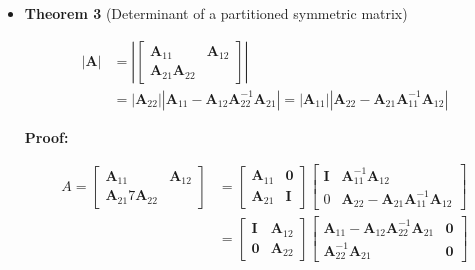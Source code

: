 \documentclass[10pt,b5paper,titlepage]{book}
\begin{document}
\begin{itemize}
    \item \textbf{Theorem 3} (Determinant of a partitioned symmetric matrix)

        \begin{equation}
            \begin{array}{ll}
                |\mathbf{A}|  &= \left|
                \begin{bmatrix}
                    \mathbf{A}_{11} & \mathbf{A}_{12}\\
                    \mathbf{A}_{21} \mathbf{A}_{22}
                \end{bmatrix}  \right|\\
                              &=
                |\mathbf{A}_{22}| |\mathbf{A}_{11} - \mathbf{A}_{12} \mathbf{A}_{22}^{-1} \mathbf{A}_{21}|
                = |\mathbf{A}_{11}| |\mathbf{A}_{22} - \mathbf{A}_{21} \mathbf{A}_{11}^{-1} \mathbf{A}_{12}|
            \end{array}
        \end{equation}

        \textbf{Proof:}

        \begin{equation}
            \begin{array}{ll}
                A = \begin{bmatrix}
                    \mathbf{A}_{11} & \mathbf{A}_{12}\\
                    \mathbf{A}_{21} 7 \mathbf{A}_{22}
                \end{bmatrix} &= \begin{bmatrix}
                    \mathbf{A}_{11} & \mathbf{0}\\
                    \mathbf{A}_{21} & \mathbf{I}
                \end{bmatrix} \begin{bmatrix}
                    \mathbf{I} & \mathbf{A}_{11}^{-1} \mathbf{A}_{12}\\
                    0 & \mathbf{A}_{22} - \mathbf{A}_{21} \mathbf{A}_{11}^{-1} \mathbf{A}_{12}
                \end{bmatrix}\\
                &= \begin{bmatrix}
                    \mathbf{I} & \mathbf{A}_{12}\\
                    \mathbf{0} & \mathbf{A}_{22}
                \end{bmatrix} \begin{bmatrix}
                    \mathbf{A}_{11} - \mathbf{A}_{12} \mathbf{A}_{22}^{-1} \mathbf{A}_{21} & \mathbf{0}\\
                    \mathbf{A}_{22}^{-1} \mathbf{A}_{21} & \mathbf{0}
                \end{bmatrix}
            \end{array}
        \end{equation}


\end{itemize}
\end{document}
